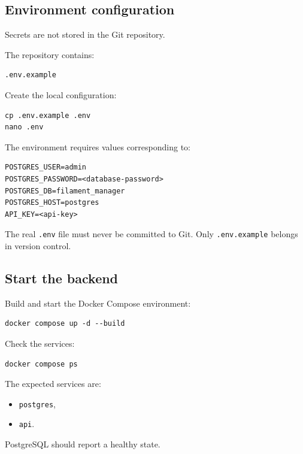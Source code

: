 \documentclass[a4paper,11pt]{article}
\begin{document}
\subsection{Environment configuration}

Secrets are not stored in the Git repository.

The repository contains:

\begin{lstlisting}
.env.example
\end{lstlisting}

Create the local configuration:

\begin{lstlisting}
cp .env.example .env
nano .env
\end{lstlisting}

The environment requires values corresponding to:

\begin{lstlisting}
POSTGRES_USER=admin
POSTGRES_PASSWORD=<database-password>
POSTGRES_DB=filament_manager
POSTGRES_HOST=postgres
API_KEY=<api-key>
\end{lstlisting}

\begin{warnbox}
The real \texttt{.env} file must never be committed to Git. Only
\texttt{.env.example} belongs in version control.
\end{warnbox}

\subsection{Start the backend}

Build and start the Docker Compose environment:

\begin{lstlisting}
docker compose up -d --build
\end{lstlisting}

Check the services:

\begin{lstlisting}
docker compose ps
\end{lstlisting}

The expected services are:

\begin{itemize}
  \item \texttt{postgres},
  \item \texttt{api}.
\end{itemize}

PostgreSQL should report a healthy state.
\end{document}
